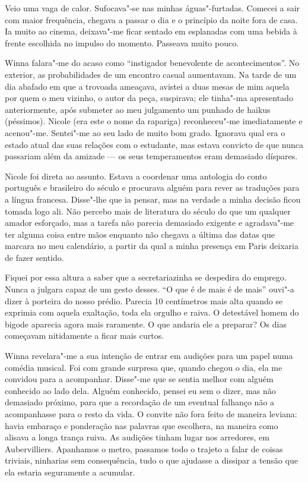 Veio uma vaga de calor. Sufocava"-se nas minhas águas"-furtadas. Comecei a sair com maior frequência, chegava a passar o dia e
o princípio da noite fora de casa. Ia muito ao cinema, deixava"-me ficar
sentado em esplanadas com uma bebida à frente escolhida no impulso do
momento. Passeava muito pouco.

Winna falara"-me do acaso como ``instigador benevolente de
acontecimentos''. No exterior, as probabilidades de um encontro casual
aumentavam. Na tarde de um dia abafado em que a trovoada ameaçava,
avistei a duas mesas de mim
aquela por quem o meu vizinho, o autor da peça, suspirava; ele tinha"-ma
apresentado anteriormente, após submeter ao meu julgamento um punhado de
haikus (péssimos). Nicole (era este o nome da rapariga) reconheceu"-me
imediatamente e acenou"-me. Sentei"-me ao seu lado de muito bom grado.
Ignorava qual era o estado atual das suas relações com o estudante, mas
estava convicto de que nunca passariam além da amizade
--- os seus temperamentos eram demasiado díspares.

Nicole foi direta ao assunto. Estava a coordenar uma antologia do conto
português e brasileiro do século  e procurava alguém para rever as
traduções para a língua francesa. Disse"-lhe que ia pensar, mas na
verdade a minha decisão ficou tomada logo ali. Não percebo mais de
literatura do século  do que um qualquer amador esforçado, mas a
tarefa não parecia demasiado exigente e agradava"-me ter alguma coisa
entre mãos enquanto não chegava a última das datas que marcara no meu
calendário, a partir da qual a minha presença em Paris deixaria de fazer
sentido.

Fiquei por essa altura a saber que a secretariazinha se despedira do
emprego. Nunca a julgara capaz de um gesto desses.
``O que é de mais é de mais'' ouvi"-a dizer à porteira do nosso prédio.
Parecia 10 centímetros mais alta quando se exprimia com aquela
exaltação, toda ela orgulho e raiva. O detestável homem do bigode
aparecia agora mais raramente. O que andaria ele a preparar? Os dias
começavam nitidamente a ficar mais curtos.

Winna revelara"-me a sua intenção de entrar em audições para um papel
numa comédia musical. Foi com grande surpresa que, quando chegou o
dia, ela me convidou para a acompanhar. Disse"-me que se sentia melhor
com alguém conhecido ao lado dela. Alguém conhecido, pensei eu sem
o dizer, mas não demasiado próximo, para que a recordação de um eventual
falhanço não a acompanhasse para o resto da vida. O convite não fora
feito de maneira leviana: havia embaraço e ponderação nas palavras que
escolhera, na maneira como alisava a longa trança ruiva. As audições
tinham lugar nos arredores, em Aubervilliers. Apanhamos o metro,
passamos todo o trajeto a falar de coisas triviais, ninharias sem
consequência, tudo o que ajudasse a dissipar a tensão que ela estaria
seguramente a acumular.

